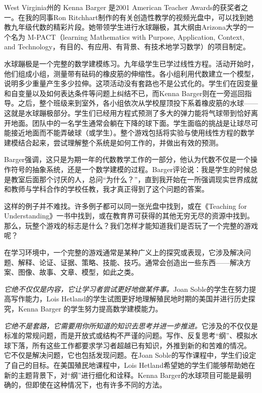 West Virginia州的 Kenna Barger 是2001 American Teacher Awards的获奖者之一。在我的同事Ron Ritchhart制作的有关创造性教学的视频光盘中，可以找到她教九年级代数的精彩片段。她带领学生进行水球蹦极，其大纲由Arizona大学的一个名为 M-PACT（learning Mathematics with Purpose, Application, Context, and Technology，有目的、有应用、有背景、有技术地学习数学）的项目制定。

水球蹦极是一个完整的数学建模练习。九年级学生已学过线性方程。活动开始时，他们组成小组，测量带有砝码的橡皮筋的伸缩性。各小组利用代数建立一个模型，说明多少重量产生多少拉伸。这项活动没有套路也不是公式化的。学生们在因变量和自变量以及如何表达条件等问题上纠结不已，而Kenna Barger则在一旁巡回指导。之后，整个班级来到室外，各小组依次从学校屋顶投下系着橡皮筋的水球——这就是水球蹦极部分。学生们已经用方程式预测了多大的弹力能将气球带到恰好离开地面。团队中的一名学生通常会躺在下降的球下面。学生面临的挑战是让球尽可能接近地面而不能弄破球（或学生）。整个游戏包括将实验与使用线性方程的数学建模结合起来，尝试理解整个系统是如何工作的，并做出有效的预测。

Barger强调，这只是为期一年的代数教学工作的一部分，他认为代数不仅是一个操作符号的抽象系统，还是一个数学建模的过程。Barger评论说：我是学生的时候总是教室后面那个讨厌的人，总问“为什么？”，直到我开始在一所强调现实世界成就和教师与学科合作的学校任教，我才真正得到了这个问题的答案。

这样的例子并不难找。许多例子都可以同一张光盘中找到，或在《Teaching for Understanding》一书中找到，或在教育界可获得的其他无穷无尽的资源中找到。那么，玩整个游戏的标志是什么？我们怎样才能知道我们是否玩了一个完整的游戏呢？

在学习环境中，一个完整的游戏通常是某种广义上的探究或表现，它涉及解决问题、解释、论证、证据、策略、技能、技巧。通常会创造出一些东西——解决方案、图像、故事、文章、模型，如此之类。

\textit{它绝不仅仅是内容，它让学习者尝试更好地做某件事。}Joan Soble的学生在努力提高写作能力，Lois Hetland的学生试图更好地理解殖民地时期的美国并进行历史探究，Kenna Barger 的学生努力提高数学建模能力。

\textit{它绝不是套路，它需要用你所知道的知识去思考并进一步推进。}它涉及的不仅仅是标准的常规问题，而是开放式或结构不严谨的问题。写作、反复思考“纲”、模拟水球下落，所有这些工作都要求学习者超越已有知识，外推到新的和苦难的情况。
它不仅是解决问题，它也包括发现问题。在Joan Soble的写作课程中，学生们设定了自己的目标。在美国殖民地课程中，Lois Hetland希望她的学生们能够帮助她在新的主题背景下，对“纲”进行细化和诠释。Kenna Barger的水球项目可能是最明确的，但即使在这种情况下，也有许多不同的方法。

